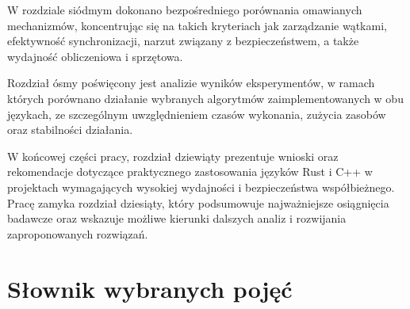 W rozdziale siódmym dokonano bezpośredniego porównania omawianych mechanizmów, koncentrując się na takich kryteriach jak zarządzanie wątkami, efektywność synchronizacji, narzut związany z bezpieczeństwem, a także wydajność obliczeniowa i sprzętowa.

Rozdział ósmy poświęcony jest analizie wyników eksperymentów, w ramach których porównano działanie wybranych algorytmów zaimplementowanych w obu językach, ze szczególnym uwzględnieniem czasów wykonania, zużycia zasobów oraz stabilności działania.

W końcowej części pracy, rozdział dziewiąty prezentuje wnioski oraz rekomendacje dotyczące praktycznego zastosowania języków Rust i C++ w projektach wymagających wysokiej wydajności i bezpieczeństwa współbieżnego. Pracę zamyka rozdział dziesiąty, który podsumowuje najważniejsze osiągnięcia badawcze oraz wskazuje możliwe kierunki dalszych analiz i rozwijania zaproponowanych rozwiązań.

\newpage
\section{Słownik wybranych pojęć}

